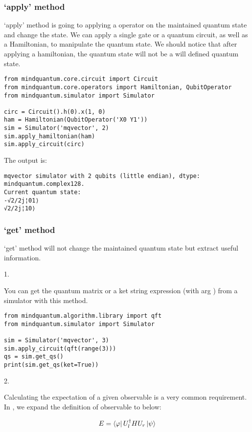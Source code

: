 \subsubsection{`apply' method}

`apply' method is going to applying a operator on the maintained quantum state and change the state. We can apply a single gate or a quantum circuit, as well as a Hamiltonian, to manipulate the quantum state. We should notice that after applying a hamiltonian, the quantum state will not be a will defined quantum state.

\begin{lstlisting}
from mindquantum.core.circuit import Circuit
from mindquantum.core.operators import Hamiltonian, QubitOperator
from mindquantum.simulator import Simulator

circ = Circuit().h(0).x(1, 0)
ham = Hamiltonian(QubitOperator('X0 Y1'))
sim = Simulator('mqvector', 2)
sim.apply_hamiltonian(ham)
sim.apply_circuit(circ)
\end{lstlisting}
The output is:
\begin{lstlisting}
mqvector simulator with 2 qubits (little endian), dtype: mindquantum.complex128.
Current quantum state:
-√2/2j¦01⟩
√2/2j¦10⟩
\end{lstlisting}

\subsubsection{`get' method}

`get' method will not change the maintained quantum state but extract useful information.

1. \getqs

You can get the quantum matrix or a ket string expression (with arg ) from a simulator with this method.
\begin{lstlisting}
from mindquantum.algorithm.library import qft
from mindquantum.simulator import Simulator

sim = Simulator('mqvector', 3)
sim.apply_circuit(qft(range(3)))
qs = sim.get_qs()
print(sim.get_qs(ket=True))
\end{lstlisting}

2. \getexpectation

Calculating the expectation of a given observable is a very common requirement. In \MindQuantum, we expand the definition of observable to below:

\begin{equation}
    E = \bra{\varphi}U_l^\dagger H U_r \ket{\psi}
\end{equation}

